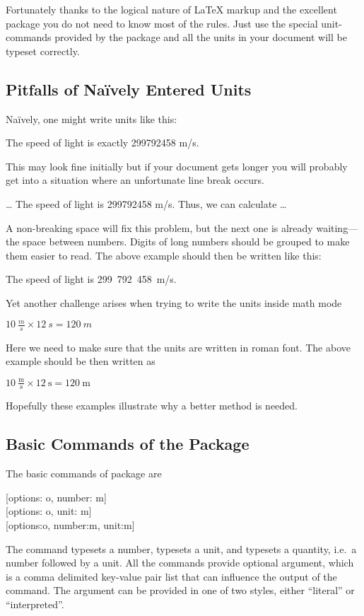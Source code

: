 Fortunately thanks to the logical nature of \LaTeX{} markup and the excellent
 package you do not need to know most of the rules. Just use the
special unit-commands provided by the package and all the units in your
document will be typeset correctly.

\subsection{Pitfalls of Naïvely Entered Units}

Naïvely, one might write units like this:
\begin{example}
The speed of light
is exactly 299792458 m/s.
\end{example}
This may look fine initially but if your document gets longer you will probably
get into a situation where an unfortunate line break occurs.
\begin{example}
\ldots{} The speed of light
is 299792458 m/s. Thus, we
can calculate \ldots
\end{example}
A non-breaking space will fix this problem, but the next one is already
waiting---the space between numbers. Digits of long numbers should be grouped
to make them easier to read. The above example should then be written like this:
\begin{example}
The speed of light is
299~792~458~m/s.
\end{example}
Yet another challenge arises when trying to write the units inside math
mode
\begin{example}
\(10~\frac{m}{s}
  \times 12~s = 120~m\)
\end{example}
Here we need to make sure that the units are written in roman font.
The above example should be then written as
\begin{example}
\(10~\frac{\textrm{m}}
  {\textrm{s}} 
  \times 12~\textrm{s} 
  = 120~\textrm{m}\)
\end{example}
Hopefully these examples illustrate why a better method is needed.

\subsection{Basic Commands of the  Package}

The basic commands of  package are
\begin{lscommand}
  [options: o, number: m]\\
  [options: o, unit: m]\\
  [options:o, number:m, unit:m]
\end{lscommand}
The  command typesets a number,  typesets a unit, and
 typesets a quantity, i.e.\ a number followed by a unit. All the
commands provide optional  argument, which is a comma delimited
key-value pair list that can influence the output of the command. The
 argument can be provided in one of two styles, either
\enquote{literal} or \enquote{interpreted}.

